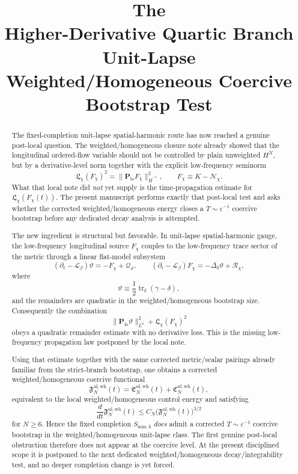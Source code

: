 \documentclass[11pt]{article}
\title{\textbf{The \TheoryName{}}\\[0.4em]
\large Higher-Derivative Quartic Branch Unit-Lapse Weighted/Homogeneous Coercive Bootstrap Test}
\author{}
\date{}
\newcommand{\Ell}{\mathcal{L}}
\begin{document}
\maketitle

\begin{abstract}
The fixed-completion unit-lapse spatial-harmonic route has now reached a genuine post-local question. The weighted/homogeneous closure note already showed that the longitudinal ordered-flow variable should not be controlled by plain unweighted \(H^N\), but by a derivative-level norm together with the explicit low-frequency seminorm
\[
\mathfrak L_\chi(F_\chi)^2
=
\|\mathbf P_{\mathrm{lo}}F_\chi\|_{\dot H^{-1}}^2,
\qquad
F_\chi \equiv K-\mathcal N_\chi.
\]
What that local note did \emph{not} yet supply is the time-propagation estimate for \(\mathfrak L_\chi(F_\chi(t))\). The present manuscript performs exactly that post-local test and asks whether the corrected weighted/homogeneous energy closes a \(T\sim \varepsilon^{-1}\) coercive bootstrap before any dedicated decay analysis is attempted.

The new ingredient is structural but favorable. In unit-lapse spatial-harmonic gauge, the low-frequency longitudinal source \(F_\chi\) couples to the low-frequency trace sector of the metric through a linear flat-model subsystem
\[
(\partial_t-\Ell_\beta)\vartheta = -F_\chi + \mathcal Q_\vartheta,
\qquad
(\partial_t-\Ell_\beta)F_\chi = -\Delta_\delta \vartheta + \mathcal R_\chi,
\]
where
\[
\vartheta \equiv \frac12 \operatorname{tr}_\delta(\gamma-\delta),
\]
and the remainders are quadratic in the weighted/homogeneous bootstrap size. Consequently the combination
\[
\|\mathbf P_{\mathrm{lo}}\vartheta\|_{L^2}^2 + \mathfrak L_\chi(F_\chi)^2
\]
obeys a quadratic remainder estimate with no derivative loss. This is the missing low-frequency propagation law postponed by the local note.

Using that estimate together with the same corrected metric/scalar pairings already familiar from the strict-branch bootstrap, one obtains a corrected weighted/homogeneous coercive functional
\[
\mathfrak F_N^{\mathrm{ul,wh}}(t)
=
\mathfrak E_N^{\mathrm{ul,wh}}(t)+\mathfrak C_N^{\mathrm{ul,wh}}(t),
\]
equivalent to the local weighted/homogeneous control energy and satisfying
\[
\frac{d}{dt}\mathfrak F_N^{\mathrm{ul,wh}}(t)
\le
C_N\bigl(\mathfrak F_N^{\mathrm{ul,wh}}(t)\bigr)^{3/2}
\]
for \(N\ge 6\). Hence the fixed completion \(S_{\mathrm{min},4}\) \emph{does} admit a corrected \(T\sim \varepsilon^{-1}\) coercive bootstrap in the weighted/homogeneous unit-lapse class. The first genuine post-local obstruction therefore does not appear at the coercive level. At the present disciplined scope it is postponed to the next dedicated weighted/homogeneous decay/integrability test, and no deeper completion change is yet forced.
\end{abstract}
\end{document}
